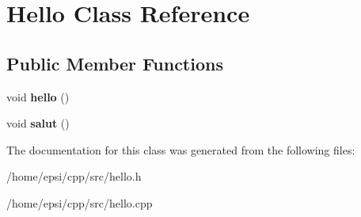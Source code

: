 \hypertarget{classHello}{}\section{Hello Class Reference}
\label{classHello}
\subsection*{Public Member Functions}
\begin{DoxyCompactItemize}
\item 
\mbox{\label{classHello_aa1a32a1c7695ed74e725860c059354cb}} 
void {\bfseries hello} ()
\item 
\mbox{\label{classHello_a975dd7c81485c192a6cd21f8833817da}} 
void {\bfseries salut} ()
\end{DoxyCompactItemize}


The documentation for this class was generated from the following files\+:\begin{DoxyCompactItemize}
\item 
/home/epsi/cpp/src/hello.\+h\item 
/home/epsi/cpp/src/hello.\+cpp\end{DoxyCompactItemize}
